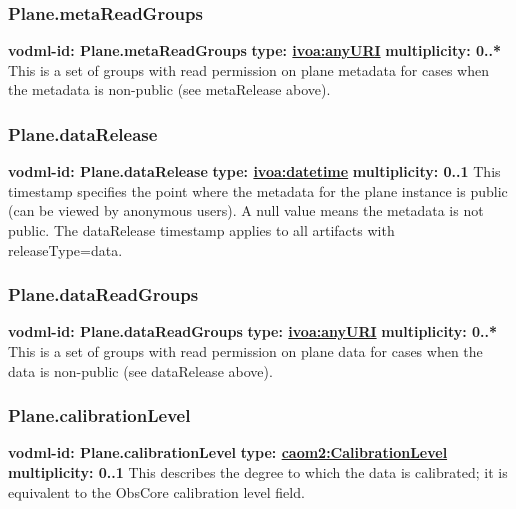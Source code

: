     \subsubsection{Plane.metaReadGroups}
      \textbf{vodml-id: Plane.metaReadGroups} \newline
      \textbf{type: \hyperref[sect:ivoa]{ivoa:anyURI}} \newline
      \textbf{multiplicity: 0..*} \newline
      This is a set of groups with read permission on plane metadata for cases when the metadata is non-public (see metaRelease above).

    \subsubsection{Plane.dataRelease}
      \textbf{vodml-id: Plane.dataRelease} \newline
      \textbf{type: \hyperref[sect:ivoa]{ivoa:datetime}} \newline
      \textbf{multiplicity: 0..1} \newline
      This timestamp specifies the point where the metadata for the plane instance is public (can be viewed by anonymous users). A null value means the metadata is not public. The dataRelease timestamp applies to all artifacts with releaseType=data.

    \subsubsection{Plane.dataReadGroups}
      \textbf{vodml-id: Plane.dataReadGroups} \newline
      \textbf{type: \hyperref[sect:ivoa]{ivoa:anyURI}} \newline
      \textbf{multiplicity: 0..*} \newline
      This is a set of groups with read permission on plane data for cases when the data is non-public (see dataRelease above).

    \subsubsection{Plane.calibrationLevel}
      \textbf{vodml-id: Plane.calibrationLevel} \newline
      \textbf{type: \hyperref[sect:CalibrationLevel]{caom2:CalibrationLevel}} \newline
      \textbf{multiplicity: 0..1} \newline
      This describes the degree to which the data is calibrated; it is equivalent to the ObsCore calibration level field.

